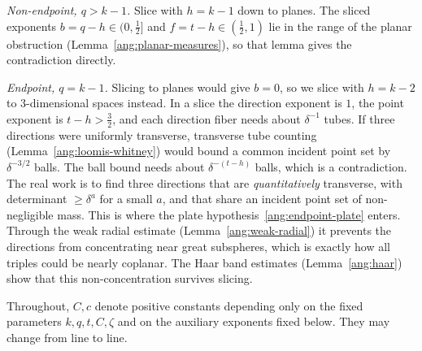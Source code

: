 \emph{Non-endpoint, $q>k-1$.} Slice with $h=k-1$ down to planes. The sliced exponents $b=q-h\in(0,\tfrac12]$ and $f=t-h\in(\tfrac12,1)$ lie in the range of the planar obstruction (Lemma~\ref{ang:planar-measures}), so that lemma gives the contradiction directly.

\emph{Endpoint, $q=k-1$.} Slicing to planes would give $b=0$, so we slice with $h=k-2$ to $3$-dimensional spaces instead. In a slice the direction exponent is $1$, the point exponent is $t-h>\tfrac32$, and each direction fiber needs about $\delta^{-1}$ tubes. If three directions were uniformly transverse, transverse tube counting (Lemma~\ref{ang:loomis-whitney}) would bound a common incident point set by $\delta^{-3/2}$ balls. The ball bound needs about $\delta^{-(t-h)}$ balls, which is a contradiction. The real work is to find three directions that are \emph{quantitatively} transverse, with determinant $\ge\delta^a$ for a small $a$, and that share an incident point set of non-negligible mass. This is where the plate hypothesis~\eqref{ang:endpoint-plate} enters. Through the weak radial estimate (Lemma~\ref{ang:weak-radial}) it prevents the directions from concentrating near great subspheres, which is exactly how all triples could be nearly coplanar. The Haar band estimates (Lemma~\ref{ang:haar}) show that this non-concentration survives slicing.

Throughout, $C,c$ denote positive constants depending only on the fixed parameters $k,q,t,C,\zeta$ and on the auxiliary exponents fixed below. They may change from line to line.

